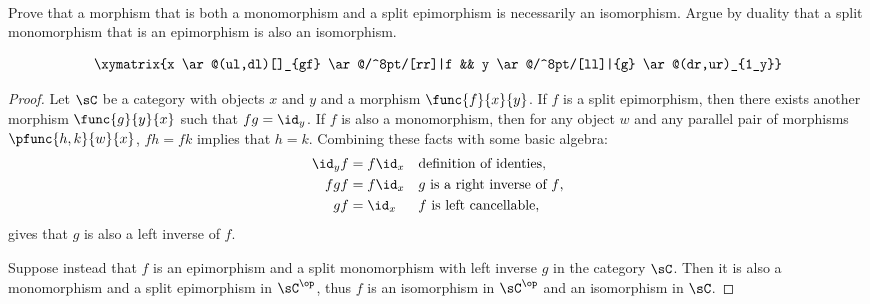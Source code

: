 \documentclass[../../main]{subfiles}
\begin{document}
\paragraph{}
\begin{exercise}
	Prove that a morphism that is both a monomorphism and a split epimorphism is
	necessarily an isomorphism. Argue by duality that a split monomorphism that
	is an epimorphism is also an isomorphism.
\end{exercise}
	\[\xymatrix{x \ar@(ul,dl)[]_{gf} \ar@/^8pt/[rr]|f && y \ar@/^8pt/[ll]|{g} \ar@(dr,ur)_{1_y}}\]
\begin{proof}
	Let \(\sC\) be a category with objects \(x\) and \(y\) and a morphism
	\(\func{f}{x}{y}\). If \(f\) is a split epimorphism, then there exists
	another morphism \(\func{g}{y}{x}\) such that \(fg=\id_y\). If \(f\) is also
	a monomorphism, then for any object \(w\) and any parallel pair of morphisms
	\(\pfunc{h,k}{w}{x}\), \(fh=fk\) implies that \(h=k\). Combining these facts
	with some basic algebra:
	\begin{align*}
		\id_yf&=f\id_x && \textrm{definition of identies}, \\
		fgf&=f\id_x && \textrm{\(g\) is a right inverse of \(f\)}, \\
		gf&=\id_x && \textrm{\(f\) is left cancellable},
	\end{align*}
	gives that \(g\) is also a left inverse of \(f\).

	Suppose instead that \(f\) is an epimorphism and a split monomorphism with
	left inverse \(g\) in the category \(\sC\). Then it is also a monomorphism
	and a split epimorphism in \(\sC^\op\), thus \(f\) is an isomorphism in
	\(\sC^\op\) and an isomorphism in \(\sC\).
\end{proof}
\end{document}

